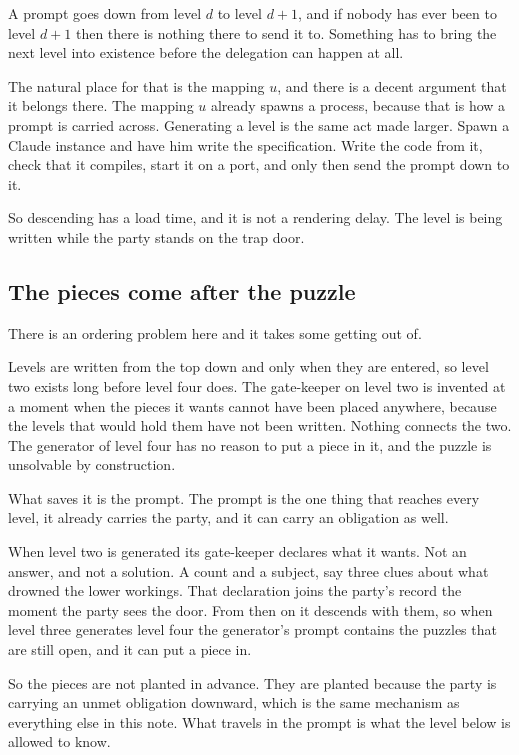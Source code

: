 \documentclass[11pt,a4paper]{article}
\begin{document}
A prompt goes down from level $d$ to level $d+1$, and if
nobody has ever been to level $d+1$ then there is nothing there to send it to. Something has to
bring the next level into existence before the delegation can happen at all.

The natural place for that is the mapping $u$, and there is a decent argument that it belongs
there. The mapping $u$ already spawns a process, because that is how a prompt is carried across.
Generating a level is the same act made larger. Spawn a Claude instance and have him write the
specification. Write the code from it, check that it compiles, start it on a port, and only then
send the prompt down to it.

\begin{sectionbox}
So descending has a load time, and it is not a rendering delay. The level is being written while
the party stands on the trap door.
\end{sectionbox}

\subsection{The pieces come after the puzzle}
\label{sec:pieces}

There is an ordering problem here and it takes some getting out of.

Levels are written from the top down and only when they are entered, so level two exists long
before level four does. The gate-keeper on level two is invented at a moment when the pieces it wants
cannot have been placed anywhere, because the levels that would hold them have not been written.
Nothing connects the two. The generator of level four has no reason to put a piece in it, and the
puzzle is unsolvable by construction.

What saves it is the prompt. The prompt is the one thing that reaches every level, it already
carries the party, and it can carry an obligation as well.

When level two is generated its gate-keeper declares what it wants. Not an answer, and not a
solution. A count and a subject, say three clues about what drowned the lower workings. That
declaration joins the party's record the moment the party sees the door. From then on it
descends with them, so when level three generates level four the generator's prompt contains the
puzzles that are still open, and it can put a piece in.

So the pieces are not planted in advance. They are planted because the party is carrying an
unmet obligation downward, which is the same mechanism as everything else in this note. What
travels in the prompt is what the level below is allowed to know.
\end{document}
